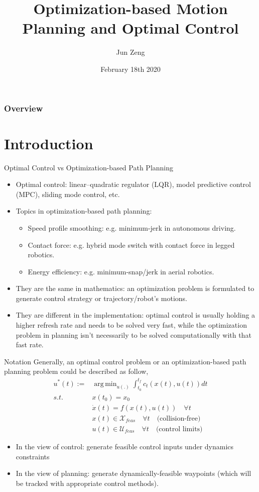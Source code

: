 \documentclass{beamer}
\title[] %
{Optimization-based Motion Planning and Optimal Control}
\author[Jun Zeng]{Jun Zeng}
\institute[UC Berkeley]
{
    Department of Mechanical Engineering \\
    University of California, Berkeley
}
\date[February 18th 2020]
{February 18th 2020}
\DeclareMathOperator*{\argmin}{arg\,min}
\begin{document}
\frame{\titlepage}

\begin{frame}
	\frametitle{Overview} 
	\tableofcontents
\end{frame}

\section{Introduction}
\begin{frame}{Optimal Control vs Optimization-based Path Planning}
	\begin{itemize}
		\item Optimal control: linear–quadratic regulator (LQR), model predictive control (MPC), sliding mode control, etc.
		\item Topics in optimization-based path planning:
		\begin{itemize}
			\item Speed profile smoothing: e.g. minimum-jerk in autonomous driving.
			\item Contact force: e.g. hybrid mode switch with contact force in legged robotics.
			\item Energy efficiency: e.g. minimum-snap/jerk in aerial robotics.
		\end{itemize} 
		\item They are the same in mathematics: an optimization problem is formulated to generate control strategy or trajectory/robot's motions.
		\item They are different in the implementation: optimal control is usually holding a higher refresh rate and needs to be solved very fast, while the  optimization problem in planning isn't necessarily to be solved computationally with that fast rate.
	\end{itemize}
\end{frame}

\begin{frame}{Notation}
	Generally, an optimal control problem or an optimization-based path planning problem could be described as follow,
	\begin{align*}
		u^*(t) :=& \argmin_{u(.)} \int_{t_0}^{t_f} c_t (x(t), u(t)) dt \\
		\textit{s.t.} \ & x(t_0) = x_0 \\
		& \dot{x}(t) = f(x(t), u(t)) \quad \forall t \\
		& x(t) \in \mathcal{X}_{feas} \quad \forall t \quad \text{(collision-free)} \\
		& u(t) \in \mathcal{U}_{feas} \quad \forall t \quad \text{(control limits)}
	\end{align*}
	\begin{itemize}
		\item In the view of control: generate feasible control inputs under dynamics constraints
		\item In the view of planning: generate dynamically-feasible waypoints (which will be tracked with appropriate control methods).
	\end{itemize}
\end{frame}
\end{document}

